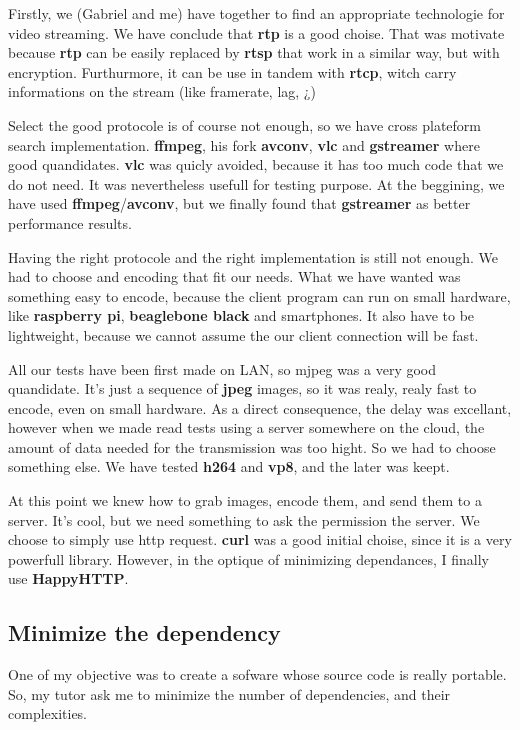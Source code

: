 \documentclass[a4paper,11pt]{custom}
\newcommand{\rtp}{\textbf{rtp}}
\newcommand{\rtcp}{\textbf{rtcp}}
\newcommand{\rtsp}{\textbf{rtsp}}
\newcommand{\vlc}{\textbf{vlc}}
\newcommand{\avconv}{\textbf{avconv}}
\newcommand{\ffmpeg}{\textbf{ffmpeg}}
\newcommand{\gstreamer}{\textbf{gstreamer}}
\newcommand{\curl}{\textbf{curl}}
\newcommand{\happyhttp}{\textbf{HappyHTTP}}
\newcommand{\jpeg}{\textbf{jpeg}}
\newcommand{\vpx}{\textbf{vp8}}
\newcommand{\mpeg}{\textbf{h264}}
\newcommand{\rpi}{\textbf{raspberry pi}}
\newcommand{\bbb}{\textbf{beaglebone black}}
\begin{document}
Firstly, we (Gabriel and me) have together to find an appropriate technologie
for video streaming. We have conclude that \rtp{} is a good choise. That was
motivate because \rtp{} can be easily replaced by \rtsp{} that work in a similar
way, but with encryption. Furthurmore, it can be use in tandem with \rtcp, witch
carry informations on the stream (like framerate, lag, ¿)

Select the good protocole is of course not enough, so we have cross plateform
search implementation. \ffmpeg, his fork \avconv, \vlc{} and \gstreamer{} where
good quandidates. \vlc{} was quicly avoided, because it has too much code that
we do not need. It was nevertheless usefull for testing purpose. At the
beggining, we have used \ffmpeg/\avconv, but we finally found that \gstreamer{}
as better performance results.

Having the right protocole and the right implementation is still not enough. We
had to choose and encoding that fit our needs. What we have wanted was something
easy to encode, because the client program can run on small hardware, like \rpi,
\bbb{} and smartphones. It also have to be lightweight, because we cannot assume
the our client connection will be fast.

All our tests have been first made on LAN, so mjpeg was a very good quandidate.
It's just a sequence of \jpeg{} images, so it was realy, realy fast to encode,
even on small hardware. As a direct consequence, the delay was excellant,
however when we made read tests using a server somewhere on the cloud, the
amount of data needed for the transmission was too hight. So we had to choose
something else. We have tested \mpeg{} and \vpx, and the later was keept.

At this point we knew how to grab images, encode them, and send them to a
server. It's cool, but we need something to ask the permission the server. We
choose to simply use http request. \curl{} was a good initial choise, since it
is a very powerfull library. However, in the optique of minimizing dependances,
I finally use \happyhttp.

\subsection{Minimize the dependency}

One of my objective was to create a sofware whose source code is really
portable. So, my tutor ask me to minimize the number of dependencies, and their
complexities.
\end{document}
